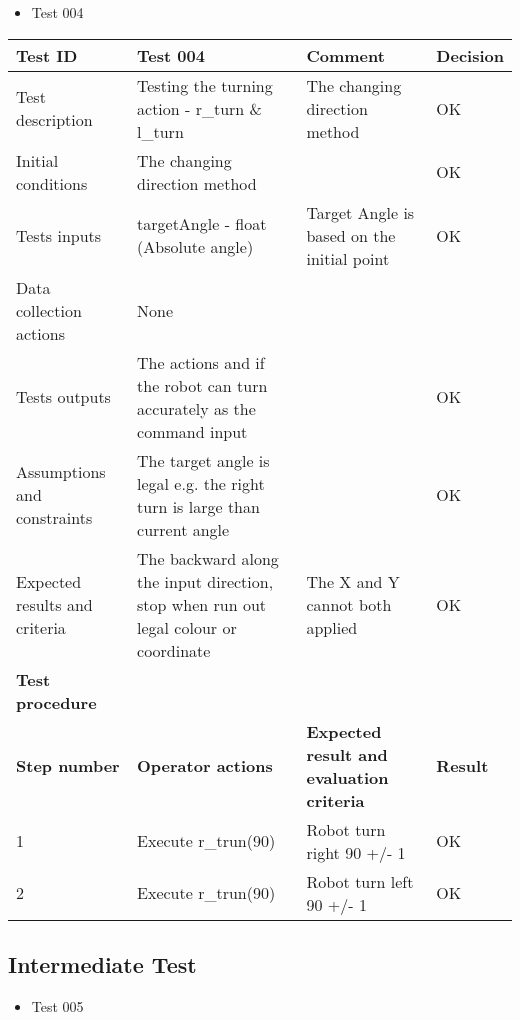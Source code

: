 \documentclass[11pt, a4paper]{article}
\begin{document}
\begin{itemize}
\item {Test 004}\\
\end{itemize}

\begin{tabular} 
	 {|p{4cm}|p{4.5cm}|p{4.5cm}|p{1.5cm}|}
\hline
\textbf{Test ID} & \textbf{Test 004} & \textbf{Comment} & \textbf{Decision}\\
\hline
{Test description} & {Testing the turning \newline action - r\_turn \& l\_turn} & {The changing direction method} & {OK}\\
\hline
{Initial conditions} & {The changing direction method} & {} & {OK}\\
\hline
{Tests inputs} & {targetAngle - float \newline (Absolute angle)} & {Target Angle is based on the \newline initial point} & {OK}\\
\hline
{Data collection actions} & {None} & {} & {}\\
\hline
{Tests outputs} & {The actions and if the robot can turn accurately as the command input} & {} & {OK}\\
\hline
{Assumptions and constraints} & {The target angle is legal \newline e.g. the right turn is large than current angle} & {} & {OK}\\
\hline
{Expected results and criteria} & {The backward along the input direction, stop when run out \newline legal colour or coordinate} & {The X and Y cannot both \newline applied} & {OK}\\
\hline
\textbf{Test procedure} & \textbf{} & \textbf{} & \textbf{}\\
\hline
\textbf{Step number} & \textbf{Operator actions} & \textbf{Expected result and \newline evaluation criteria} & \textbf{Result}\\
\hline
{1} & {Execute \newline r\_trun(90)} & {Robot turn right 90 +/- 1} & {OK}\\
\hline
{2} & {Execute \newline r\_trun(90)} & {Robot turn left 90 +/- 1} & {OK}\\
\hline
\end{tabular}
\newpage

\subsection{Intermediate Test}
\begin{itemize}
\item {Test 005}\\
\end{itemize}
\end{document}
